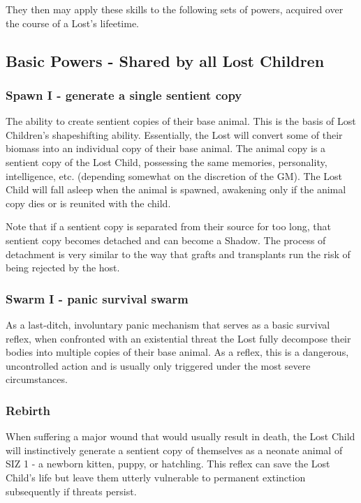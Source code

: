 \documentclass[letterpaper,serif]{rpg-module}
\begin{document}
They then may apply these skills to the following sets of powers, acquired over the course of a Lost's lifeetime.  
		
\subsection{Basic Powers - Shared by all Lost Children}

 \subsubsection{Spawn I - generate a single sentient copy}
 
 The ability to create sentient copies of their base animal. This is the basis of Lost Children's shapeshifting ability. Essentially, the Lost will convert some of their biomass into an individual copy of their base animal. The animal copy is a sentient copy of the Lost Child, possessing the same memories, personality, intelligence, etc. (depending somewhat on the discretion of the GM). The Lost Child will fall asleep when the animal is spawned, awakening only if the animal copy dies or is reunited with the child. 
	
Note that if a sentient copy is separated from their source for too long, that sentient copy becomes detached and can become a Shadow. The process of detachment is very similar to the way that grafts and transplants run the risk of being rejected by the host.         

\subsubsection{Swarm I - panic survival swarm} 

As a last-ditch, involuntary panic mechanism 
	that serves as a basic survival reflex, when confronted with an existential 
	threat the Lost fully decompose their bodies into multiple copies of their base animal. As a reflex, this is a dangerous, uncontrolled action and is usually only triggered under the most severe circumstances. 

\subsubsection{Rebirth}

When suffering a major wound that would usually result in death, the Lost Child will instinctively generate a sentient copy of themselves as a neonate animal of SIZ 1 - a newborn kitten, puppy, or hatchling. This reflex can save the Lost Child's life but leave them utterly vulnerable to permanent extinction subsequently if threats persist. 
\end{document}
